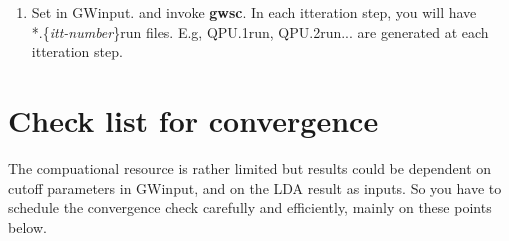 \documentclass[a4paper,10pt,epsf,fleqn]{article}
\newcommand{\keyw}[1]{\fbox{\tt #1}}
\newcommand{\exe}[1]{{\bf #1}}
\newcommand{\io}[1]{{\sf  #1}}
\newcommand{\raw}[1]{{\tt #1}}
\begin{document}
{{{\begin{enumerate}
On the other hand, "\verb#constraint#" section is from 43th.
This means that we assign "higher bands for extrapolation" 
from 43th.
This is controlled by \raw{emax} in \raw{SIGP}.
The extrapolated values are given by \raw{asig,bsig}.
In this case, these values in "\verb#constraint#" 
correspond to \verb#asig=0 bsig=.06#.\\

At the same time you see lines as
{\small \baselineskip=2.5mm
\begin{verbatim}
 hambls: sig(low,high) = 0.0000,0.2353  fit : 0.1447 + -0.0238 * E(lda) (1768 points)
\end{verbatim}}
in the same standard output of \exe{lmf}. Here\\
\verb#fit : 0.1447 + -0.0238 * E(lda)# gives
linear fitting of \verb#sig_ii# as function of \verb#E(lda)#.
These are important informations to supply reasonable \verb#asig,bsig#.

If you want to use these values, you set asig=0.1447, bsig=-0.0238 in \verb#SIGP# token.
(however, this case is a fit up to 2.500 (Ry). So not so good. 
Negative bsig is a bit strange---it may be better to choose fitting region... See gw.txt).\\

At the end, you have to give reasonable parameters for \verb#SIGP# including \raw{asig,bsig}.
Note that you have to set \raw{emax} in \raw{SIGP} and \verb#emax_sigm# 
in \io{GWinput} so as to have some overlap, so that \verb#sig_ii# should
be determined directly or the extrapolation.
We expect that these numbers affects little to final results anyway.
With our experiences \raw{emax} in \raw{SIGP} $\sim 2.0$Ry is good for NiO and so.

Anyway see \verb#ecal_sc/lm-6.14/doc/gw.txt# for details.

\item Set \keyw{iSigMode} in \io{GWinput}. 
      and invoke \exe{gwsc}. In each itteration step, you will have\\
      *.\{{\it itt-number}\}run files. E.g, QPU.1run, QPU.2run... 
      are generated at each itteration step.
\end{enumerate}




\section{Check list for convergence}
\label{checklist}
The compuational resource is rather limited
but results could be dependent on cutoff parameters in \io{GWinput},
and on the LDA result as inputs.
So you have to schedule the convergence check carefully 
and efficiently, mainly on these points below.

}}}
\end{document}
